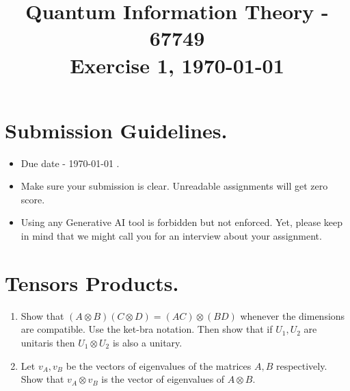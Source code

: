 \documentclass[12pt,a4paper]{article}
\title{ \begin{framed} Quantum Information Theory - 67749 \\ 
Exercise 1, \today \end{framed}  }
\date{\vspace{-5ex}}
\begin{document}
\maketitle{ }    


\newcommand{\CCZ}{\textbf{CCZ}}
\newcommand{\CCX}{\textbf{CCX}}


\setcounter{enumcirc}{1} 


\newcommand{\advanceday}[1][11]{%
\begingroup
\AdvanceDate[#1]%
\today%
\endgroup
}%


\newcommand{\subqCircEx}[2]{\begin{subfigure}[t]{0.5\textwidth}
        \stepcounter{enumcirc} \caption*{ (\alph{enumcirc}) #1} \centering 
        #2
    \end{subfigure}
}

\newcommand{\qCircEx}[4]{\begin{figure*}[h!]
    \centering
    \subqCircEx{#1}{#2}
    ~ 
    \subqCircEx{#3}{#4}
\end{figure*}
}

\newcommand{\qCircExfullline}[2]{\begin{figure*}[h!]
    \stepcounter{enumcirc} \caption*{ (\alph{enumcirc}) #1}
        \centering 
        #2
\end{figure*}
}



\section{Submission Guidelines.}
\begin{itemize}
    \item Due date - \advanceday. 
    \item Make sure your submission is clear. Unreadable assignments will get zero score.  
    \item Using any Generative AI tool is forbidden but not enforced. Yet, please keep in mind that we might call you for an interview about your assignment. 
\end{itemize}

\newpage

\section{Tensors Products.}
\begin{enumerate}
    \item Show that $(A \otimes B)(C \otimes D) = (AC) \otimes (BD)$ whenever the dimensions are compatible. Use the ket-bra notation. Then show that if $U_1, U_2$ are unitaris then $U_1 \otimes U_2$ is also a unitary. 
    
    \item Let $v_A, v_B$ be the vectors of eigenvalues of the matrices $A,B$ respectively. Show that $v_A \otimes v_B$ is the vector of eigenvalues of $A \otimes B$.
    
\end{enumerate}
\end{document}
